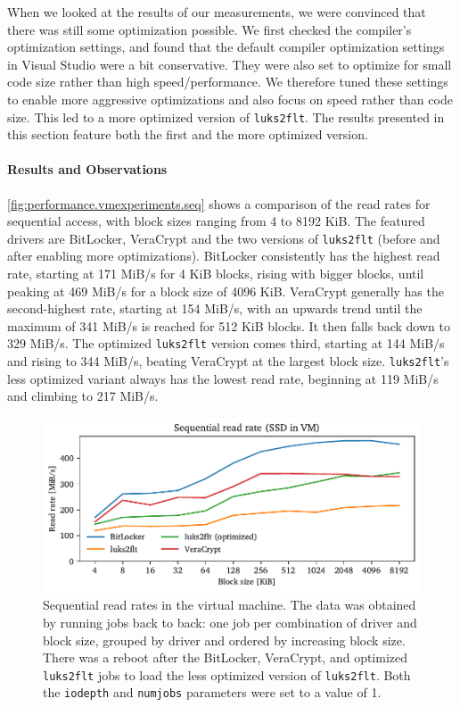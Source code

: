 When we looked at the results of our measurements, we were convinced that there was still some optimization possible. We first checked the compiler's optimization settings, and found that the default compiler optimization settings in Visual Studio were a bit conservative. They were also set to optimize for small code size rather than high speed/performance. We therefore tuned these settings to enable more aggressive optimizations and also focus on speed rather than code size. This led to a more optimized version of \texttt{luks2flt}. The results presented in this section feature both the first and the more optimized version.

\paragraph{Results and Observations}
\autoref{fig:performance.vmexperiments.seq} shows a comparison of the read rates for sequential access, with block sizes ranging from 4 to 8192 KiB. The featured drivers are BitLocker, VeraCrypt and the two versions of \texttt{luks2flt} (before and after enabling more optimizations). BitLocker consistently has the highest read rate, starting at 171 MiB/s for 4 KiB blocks, rising with bigger blocks, until peaking at 469 MiB/s for a block size of 4096 KiB. VeraCrypt generally has the second-highest rate, starting at 154 MiB/s, with an upwards trend until the maximum of 341 MiB/s is reached for 512 KiB blocks. It then falls back down to 329 MiB/s. The optimized \texttt{luks2flt} version comes third, starting at 144 MiB/s and rising to 344 MiB/s, beating VeraCrypt at the largest block size. \texttt{luks2flt}'s less optimized variant always has the lowest read rate, beginning at 119 MiB/s and climbing to 217 MiB/s.

\begin{figure}[htb!]
	\center
	\includegraphics[scale=1]{../fig/performance.vmexperiments.seq.pdf}
	\caption[
		Sequential read rates in the virtual machine
	]{
		Sequential read rates in the virtual machine. The data was obtained by running jobs back to back: one job per combination of driver and block size, grouped by driver and ordered by increasing block size. There was a reboot after the BitLocker, VeraCrypt, and optimized \texttt{luks2flt} jobs to load the less optimized version of \texttt{luks2flt}. Both the \texttt{iodepth} and \texttt{numjobs} parameters were set to a value of 1.
	}
	\label{fig:performance.vmexperiments.seq}
\end{figure}

